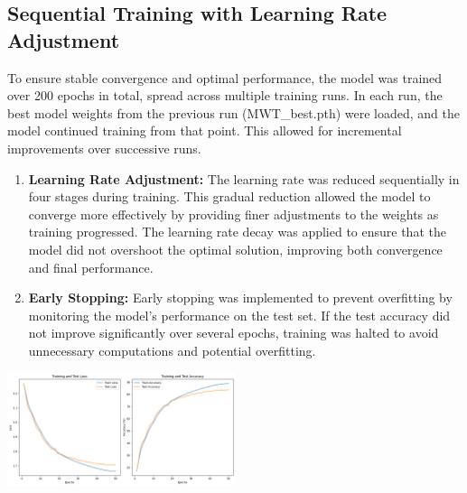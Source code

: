 \documentclass[twoside, 11pt]{article}
\begin{document}
\subsection{Sequential Training with Learning Rate Adjustment}
To ensure stable convergence and optimal performance, the model was trained over 200 epochs in total, spread across multiple training runs. In each run, the best model weights from the previous run (MWT\_best.pth) were loaded, and the model continued training from that point. This allowed for incremental improvements over successive runs.
\begin{enumerate}
    \item \textbf{Learning Rate Adjustment:} The learning rate was reduced sequentially in four stages during training. This gradual reduction allowed the model to converge more effectively by providing finer adjustments to the weights as training progressed. The learning rate decay was applied to ensure that the model did not overshoot the optimal solution, improving both convergence and final performance.
    \item \textbf{Early Stopping:} Early stopping was implemented to prevent overfitting by monitoring the model's performance on the test set. If the test accuracy did not improve significantly over several epochs, training was halted to avoid unnecessary computations and potential overfitting.
\end{enumerate}

\includegraphics[width=0.5\textwidth]{Training.png}
\end{document}
